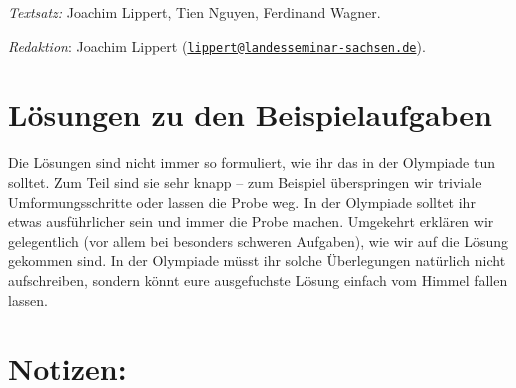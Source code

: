 \documentclass[a4paper, 12pt]{article}
\begin{document}
	\emph{Textsatz:} Joachim Lippert, Tien Nguyen, Ferdinand Wagner.
	
	\emph{Redaktion}: Joachim Lippert (\href{mailto:lippert@landesseminar-sachsen.de}{\texttt{lippert@landesseminar-sachsen.de}}).
	\normalsize
	
	\newpage
	\renewcommand{\baselinestretch}{1}\normalsize
	\tableofcontents
	
	\vspace{1cm}
	
	
	
	\newpage{}
	\newpage
	\newpage
	\newpage
	
	\newpage
	\newpage
	\newpage
	
	\newpage
	
	\newpage
	\newpage
	
	\section*{Lösungen zu den Beispielaufgaben}
	Die Lösungen sind nicht immer so formuliert, wie ihr das in der Olympiade tun solltet. Zum Teil sind sie sehr knapp -- zum Beispiel überspringen wir triviale Umformungsschritte oder lassen die Probe weg. In der Olympiade solltet ihr etwas ausführlicher sein und immer die Probe machen. Umgekehrt erklären wir gelegentlich (vor allem bei besonders schweren Aufgaben), wie wir auf die Lösung gekommen sind. In der Olympiade müsst ihr solche Überlegungen natürlich nicht aufschreiben, sondern könnt eure ausgefuchste Lösung einfach vom Himmel fallen lassen.
	
	
	
	
	
	
	
	
	\newpage
	\newpage
	
	\section*{Notizen:}
\end{document}
